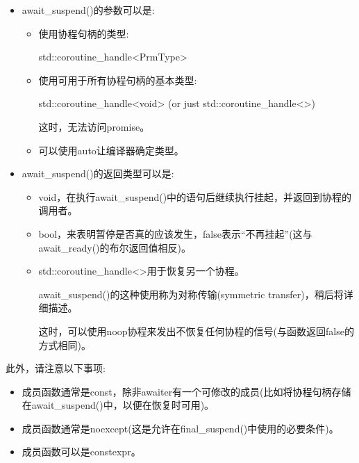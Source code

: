 \begin{itemize}
\item
await\_suspend()的参数可以是:

\begin{itemize}
\item
使用协程句柄的类型:
\begin{cpp}
std::coroutine_handle<PrmType>
\end{cpp}

\item
使用可用于所有协程句柄的基本类型:
\begin{cpp}
std::coroutine_handle<void> (or just std::coroutine_handle<>)
\end{cpp}

这时，无法访问promise。

\item
可以使用auto让编译器确定类型。
\end{itemize}

\item
await\_suspend()的返回类型可以是:
\begin{itemize}
\item
void，在执行await\_suspend()中的语句后继续执行挂起，并返回到协程的调用者。

\item
bool，来表明暂停是否真的应该发生，false表示“不再挂起”(这与await\_ready()的布尔返回值相反)。

\item
std::coroutine\_handle<>用于恢复另一个协程。

await\_suspend()的这种使用称为对称传输(symmetric transfer)，稍后将详细描述。

这时，可以使用noop协程来发出不恢复任何协程的信号(与函数返回false的方式相同)。
\end{itemize}
\end{itemize}

此外，请注意以下事项:

\begin{itemize}
\item
成员函数通常是const，除非awaiter有一个可修改的成员(比如将协程句柄存储在await\_suspend()中，以便在恢复时可用)。

\item
成员函数通常是noexcept(这是允许在final\_suspend()中使用的必要条件)。

\item
成员函数可以是constexpr。
\end{itemize}


